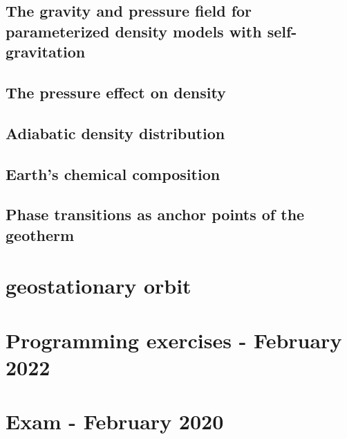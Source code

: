 \subsection{The gravity and pressure field for parameterized density models with self-gravitation}
\label{sect_param_densmod}  %
\subsection{The pressure effect on density} %
\label{Pressure_density}  %
\subsection{Adiabatic density distribution} %
\label{Adiabatic density distribution}  %
\subsection{Earth's chemical composition} %
\label{section-chemical-composition}  %
\subsection{Phase transitions as anchor points of the geotherm} %
\label{section-anchor points}  %

\section{geostationary orbit}


\newpage
\section{Programming exercises - February 2022 \label{exgravptmass}} 

\newpage
\section{Exam - February 2020} 
\newpage
